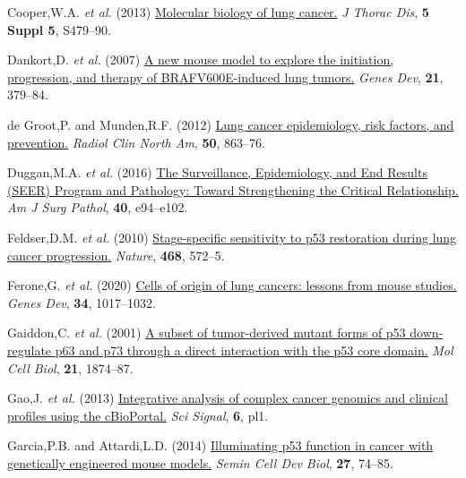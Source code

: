 \begin{CSLReferences}{1}{0}
\leavevmode{}%
Cooper,W.A. \emph{et al.} (2013) \href{https://doi.org/10.3978/j.issn.2072-1439.2013.08.03}{Molecular biology of lung cancer.} \emph{J Thorac Dis}, \textbf{5 Suppl 5}, S479--90.

\leavevmode{}%
Dankort,D. \emph{et al.} (2007) \href{https://doi.org/10.1101/gad.1516407}{A new mouse model to explore the initiation, progression, and therapy of BRAFV600E-induced lung tumors.} \emph{Genes Dev}, \textbf{21}, 379--84.

\leavevmode{}%
de Groot,P. and Munden,R.F. (2012) \href{https://doi.org/10.1016/j.rcl.2012.06.006}{Lung cancer epidemiology, risk factors, and prevention.} \emph{Radiol Clin North Am}, \textbf{50}, 863--76.

\leavevmode{}%
Duggan,M.A. \emph{et al.} (2016) \href{https://doi.org/10.1097/pas.0000000000000749}{The Surveillance, Epidemiology, and End Results (SEER) Program and Pathology: Toward Strengthening the Critical Relationship.} \emph{Am J Surg Pathol}, \textbf{40}, e94--e102.

\leavevmode{}%
Feldser,D.M. \emph{et al.} (2010) \href{https://doi.org/10.1038/nature09535}{Stage-specific sensitivity to p53 restoration during lung cancer progression.} \emph{Nature}, \textbf{468}, 572--5.

\leavevmode{}%
Ferone,G. \emph{et al.} (2020) \href{https://doi.org/10.1101/gad.338228.120}{Cells of origin of lung cancers: lessons from mouse studies.} \emph{Genes Dev}, \textbf{34}, 1017--1032.

\leavevmode{}%
Gaiddon,C. \emph{et al.} (2001) \href{https://doi.org/10.1128/mcb.21.5.1874-1887.2001}{A subset of tumor-derived mutant forms of p53 down-regulate p63 and p73 through a direct interaction with the p53 core domain.} \emph{Mol Cell Biol}, \textbf{21}, 1874--87.

\leavevmode{}%
Gao,J. \emph{et al.} (2013) \href{https://doi.org/10.1126/scisignal.2004088}{Integrative analysis of complex cancer genomics and clinical profiles using the cBioPortal.} \emph{Sci Signal}, \textbf{6}, pl1.

\leavevmode{}%
Garcia,P.B. and Attardi,L.D. (2014) \href{https://doi.org/10.1016/j.semcdb.2013.12.014}{Illuminating p53 function in cancer with genetically engineered mouse models.} \emph{Semin Cell Dev Biol}, \textbf{27}, 74--85.


\end{CSLReferences}
